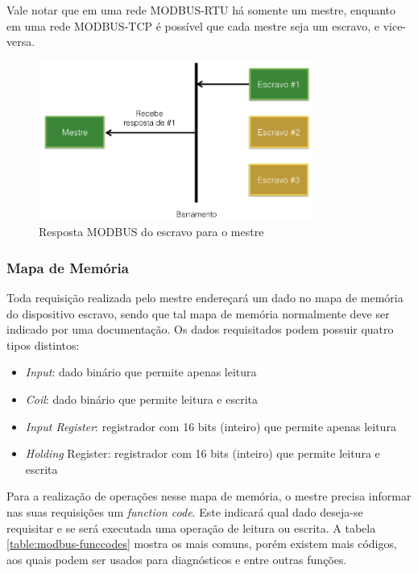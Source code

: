         Vale notar que em uma rede MODBUS-RTU há somente um mestre, enquanto em uma rede MODBUS-TCP é possível que cada mestre seja um escravo, e vice-versa.

        \begin{figure}[H]
          \begin{center}
            \includegraphics[width=0.8\textwidth,natwidth=1024,natheight=768]{assets/images/modbus-req-2.png}
            \caption{Resposta MODBUS do escravo para o mestre}
            \label{fig:modbus-req-2}
          \end{center}
        \end{figure}

      \subsubsection{Mapa de Memória}
      \label{methodology:tools:modbus:memorymap}

        Toda requisição realizada pelo mestre endereçará um dado no mapa de memória do dispositivo escravo, sendo que tal mapa de memória normalmente deve ser indicado por uma documentação. Os dados requisitados podem possuir quatro tipos distintos:

        \begin{itemize}
          \item \textit{Input}: dado binário que permite apenas leitura
          \item \textit{Coil}: dado binário que permite leitura e escrita
          \item \textit{Input Register}: registrador com 16 bits (inteiro) que permite apenas leitura
          \item \textit{Holding} Register: registrador com 16 bits (inteiro) que permite leitura e escrita
        \end{itemize}

        Para a realização de operações nesse mapa de memória, o mestre precisa informar nas suas requisições um \textit{function code}. Este indicará qual dado deseja-se requisitar e se será executada uma operação de leitura ou escrita. A tabela \ref{table:modbus-funccodes} mostra os mais comuns, porém existem mais códigos, aos quais podem ser usados para diagnósticos e entre outras funções.

